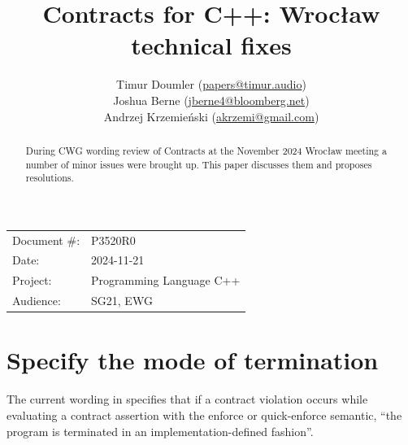 \title{Contracts for C++: Wroc\l aw technical fixes}
\author{
Timur Doumler \small(\href{mailto:papers@timur.audio}{papers@timur.audio}) \\
Joshua Berne \small(\href{mailto:jberne4@bloomberg.net}{jberne4@bloomberg.net}) \\
Andrzej Krzemie\' nski \small(\href{mailto:akrzemi@gmail.com}{akrzemi@gmail.com}) \\
}
\date{}
\maketitle

\begin{tabular}{ll}
Document \#: & P3520R0 \\
Date: &2024-11-21 \\
Project: & Programming Language C++ \\
Audience: & SG21, EWG
\end{tabular}

\begin{abstract}
During CWG wording review of Contracts \cite{P2900R11} at the November 2024 Wroc\l aw meeting a number of minor issues were brought up. This paper discusses them and proposes resolutions.
\end{abstract}







\section{Specify the mode of termination}

The current wording in \cite{P2900R11} specifies that if a contract violation occurs while evaluating a contract assertion with the enforce or quick-enforce semantic, ``the program is terminated in an implementation-defined fashion''.


